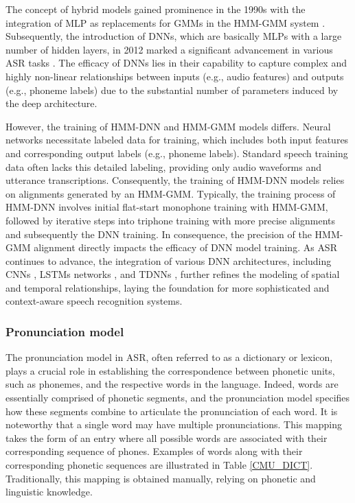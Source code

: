 The concept of hybrid models gained prominence in the 1990s with the integration of \ac{MLP} as replacements for \acp{GMM} in the \ac{HMM-GMM} system \cite{bourlard2012connectionist,meinedo2003audimus}. Subsequently, the introduction of \acp{DNN}, which are basically \acp{MLP} with a large number of hidden layers, in 2012 marked a significant advancement in various \ac{ASR} tasks \cite{hmm-dnn}. The efficacy of \acp{DNN} lies in their capability to capture complex and highly non-linear relationships between inputs (e.g., audio features) and outputs (e.g., phoneme labels) due to the substantial number of parameters induced by the deep architecture.

However, the training of \ac{HMM-DNN} and \ac{HMM-GMM} models differs. Neural networks necessitate labeled data for training, which includes both input features and corresponding output labels (e.g., phoneme labels). Standard speech training data often lacks this detailed labeling, providing only audio waveforms and utterance transcriptions. Consequently, the training of \ac{HMM-DNN} models relies on alignments generated by an \ac{HMM-GMM}. Typically, the training process of \ac{HMM-DNN} involves initial flat-start monophone training with \ac{HMM-GMM}, followed by iterative steps into triphone training with more precise alignments and subsequently the \ac{DNN} training. In consequence, the precision of the \ac{HMM-GMM} alignment directly impacts the efficacy of \ac{DNN} model training. As \ac{ASR} continues to advance, the integration of various \ac{DNN} architectures, including \acp{CNN} \cite{lang1990time}, \acp{LSTM} networks \cite{sak2014long}, and \acp{TDNN} \cite{waibel2013phoneme}, further refines the modeling of spatial and temporal relationships, laying the foundation for more sophisticated and context-aware speech recognition systems.

\subsubsection{Pronunciation model} %
The pronunciation model in \ac{ASR}, often referred to as a dictionary or lexicon, plays a crucial role in establishing the correspondence between phonetic units, such as phonemes, and the respective words in the language. Indeed, words are essentially comprised of phonetic segments, and the pronunciation model specifies how these segments combine to articulate the pronunciation of each word. It is noteworthy that a single word may have multiple pronunciations. This mapping takes the form of an entry where all possible words are associated with their corresponding sequence of phones. Examples of words along with their corresponding phonetic sequences are illustrated in Table \ref{CMU_DICT}. Traditionally, this mapping is obtained manually, relying on phonetic and linguistic knowledge. 


